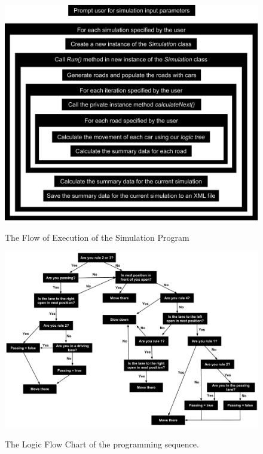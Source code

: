 \documentclass{amsart}
\begin{document}
	\begin{figure}[H]
	\begin{center}
	\includegraphics[scale=0.49]{MCMProgramFlow}
	\caption{The Flow of Execution of the Simulation Program}
	\renewcommand{\figurename}{}
	\label{MCMProgramFlow}
	\end{center}
	\end{figure}		
	
	
	\begin{figure}[H]
	\begin{center}
	\includegraphics[scale=0.36]{MCM-LogicalFlowChart.pdf}
	\caption{The Logic Flow Chart of the programming sequence.}
	\renewcommand{\figurename}{}
\label{MCM-LogicalFlowChart}
	\end{center}	
	\end{figure}
	
\end{document}
